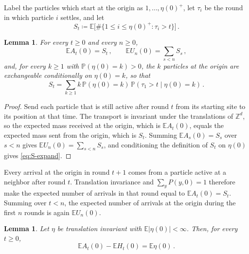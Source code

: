 \documentclass[11pt]{amsart}
\theoremstyle{plain}
\newtheorem{lemma}[theorem]{Lemma}
\theoremstyle{definition}
\newcommand{\Z}{\mathbb{Z}}
\newcommand{\E}{\mathbb{E}}
\renewcommand{\P}{\mathbb{P}}
\begin{document}
Label the particles which start at the origin as
$1,\ldots,\eta(0)^+$, let $\tau_i$ be the round in which particle $i$ settles,
and let
\[
	S_t\coloneqq\E\bigl[\#\{1\leq i\leq\eta(0)^+:\tau_i>t\}\bigr]\,.
\]

\begin{lemma}\label{lem:transport}
	For every $t\geq0$ and every $n\geq0$,
	\begin{equation}\label{eq:transport}
		\E A_t(0)=S_t\,,
		\qquad
		\E U_n(0)=\sum_{s<n}S_s\,,
	\end{equation}
	and, for every $k\geq1$ with $\P(\eta(0)=k)>0$, the $k$ particles at the
	origin are exchangeable conditionally on $\eta(0)=k$, so that
	\begin{equation}\label{eq:S-expand}
		S_t=\sum_{k\geq1}k\,\P(\eta(0)=k)\,\P(\tau_1>t\mid\eta(0)=k)\,.
	\end{equation}
\end{lemma}

\begin{proof}
	Send each particle that is still active after round $t$ from its starting
	site to its position at that time. The transport is invariant under the
	translations of $\Z^d$, so the expected mass received at the origin, which is
	$\E A_t(0)$, equals the expected mass sent from the origin, which is $S_t$.
	Summing $\E A_s(0)=S_s$ over $s<n$ gives $\E U_n(0)=\sum_{s<n}S_s$, and
	conditioning the definition of $S_t$ on $\eta(0)$ gives \eqref{eq:S-expand}.
\end{proof}

Every arrival at the origin in round $t+1$ comes from a particle active at a
neighbor after round $t$. Translation invariance and $\sum_yP(y,0)=1$ therefore
make the expected number of arrivals in that round equal to $\E A_t(0)=S_t$.
Summing over $t<n$, the expected number of arrivals at the origin during the
first $n$ rounds is again $\E U_n(0)$.

\begin{lemma}\label{lem:activity-holes}
	Let $\eta$ be translation invariant with $\E|\eta(0)|<\infty$.
	Then, for every $t\geq0$,
	\begin{equation}\label{eq:activity-holes}
		\E A_t(0)-\E H_t(0)=\E\eta(0)\,.
	\end{equation}
\end{lemma}
\end{document}
